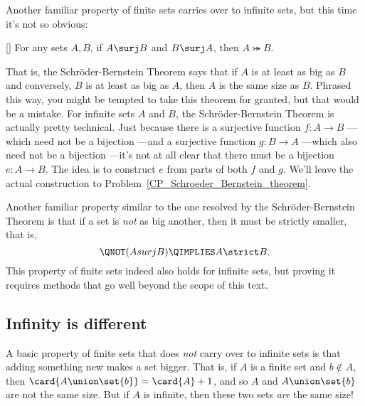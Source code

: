 Another familiar property of finite sets carries over to infinite
sets, but this time it's not so obvious:
\begin{theorem}\label{S-B_thm} \mbox{}
 [] For any sets $A,B$, if $A \surj B$ and
 $B \surj A$, then $A \bij B$.
\end{theorem}

That is, the Schr\"oder-Bernstein Theorem says that if $A$ is at least
as big as $B$ and conversely, $B$ is at least as big as $A$, then $A$
is the same size as $B$.  Phrased this way, you might be tempted to
take this theorem for granted, but that would be a mistake.  For
infinite sets $A$ and $B$, the Schr\"oder-Bernstein Theorem is
actually pretty technical.  Just because there is a surjective
function $f:A\to B$ ---which need not be a bijection ---and a
surjective function $g:B \to A$ ---which also need not be a bijection
---it's not at all clear that there must be a bijection $e:A \to B$.
The idea is to construct $e$ from parts of both $f$ and $g$.  We'll
leave the actual construction to
Problem~\ref{CP_Schroeder_Bernstein_theorem}.

Another familiar property similar to the one resolved by the
Schr\"oder-Bernstein Theorem is that if a set is \emph{not} as big
another, then it must be strictly smaller, that is,
\[
\QNOT(A surj B) \QIMPLIES A \strict B.
\]
This property of finite sets indeed also holds for infinite sets, but
proving it requires methods that go well beyond the scope of this
text.

\subsection{Infinity is different}

A basic property of finite sets that does \emph{not} carry over to
infinite sets is that adding something new makes a set bigger.  That
is, if $A$ is a finite set and $b \notin A$, then $\card{A \union
  \set{b}} = \card{A}+1$, and so $A$ and $A \union \set{b}$ are not
the same size.  But if $A$ is infinite, then these two sets \emph{are}
the same size!

